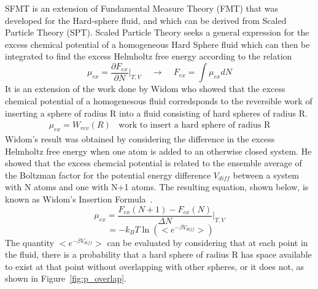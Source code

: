 \documentclass[double,12pt]{beavtex}
\begin{document}
SFMT is an extension of Fundamental Measure Theory (FMT)
that was developed for the Hard-sphere fluid, and which can be derived from
Scaled Particle Theory (SPT).  
Scaled Particle Theory seeks a general expression for the excess chemical 
potential of a homogeneous Hard Sphere fluid which can then be integrated 
to find the excess Helmholtz free energy according to the relation
\begin{equation}\mu_{ex}=\frac{\partial{F_{ex}}}{\partial{N}}\bigg|_{T,V}{~~~~~}\rightarrow{~~~~~}F_{ex}=\int{\mu_{ex}dN}\end{equation}
It is an extension of the work done by Widom who showed that the excess 
chemical potential of a homogenesous fluid corredsponds to the reversible 
work of inserting a sphere of radius R into a fluid consisting of hard 
spheres of radius R. 
\begin{align}
	\mu_{ex}=W_{rev}(R){~~~~}\text{work to insert a hard sphere of radius R}
\end{align}
Widom's result was obtained by considering the difference 
in the excess Helmholtz free energy when one atom is added to an otherwise 
closed system. He showed that the excess chemcial potential is related to 
the ensemble average of the Boltzman factor for the potential energy 
difference $V_{diff}$ between a system with N atoms and one with N+1 atoms. 
The resulting equation, shown below, is known as Widom's Insertion 
Formula~\cite{Hansen}.
\begin{equation}\mu_{ex}=\frac{F_{ex}(N+1)-F_{ex}(N)}{\Delta{N}}\bigg|_{T,V}\end{equation}
\begin{equation}\label{widoms-insertion-formula}{~}=-k_BT\ln\left(<e^{-\beta{V_{diff}}}>\right)\end{equation}
The quantity $<e^{-\beta{V_{diff}}}>$ can be evaluated by considering
that at each point in the fluid, there is a probability that 
a hard sphere of radius R has space available to exist at that point
without overlapping with other spheres, or it does not, as shown in 
Figure~\ref{fig:p_overlap}. 
\end{document}

